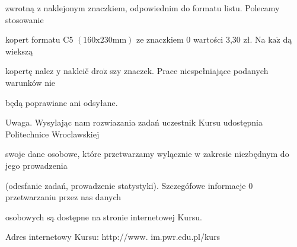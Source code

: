 \documentclass[a4paper,12pt]{article}
\begin{document}
zwrotną $\mathrm{z}$ naklejonym znaczkiem, odpowiednim do formatu listu. Polecamy stosowanie

kopert formatu C5 $(160\mathrm{x}230\mathrm{m}\mathrm{m})$ ze znaczkiem $0$ wartości 3,30 zł. Na $\mathrm{k}\mathrm{a}\dot{\mathrm{z}}$ dą wiekszą

kopertę nalez $\mathrm{y}$ nakleič $\mathrm{d}\mathrm{r}\mathrm{o}\dot{\mathrm{z}}$ szy znaczek. Prace niespełniające podanych warunków nie

będą poprawiane ani odsyłane.

Uwaga. Wysylając nam rozwiazania zadań uczestnik Kursu udostępnia Politechnice Wroclawskiej

swoje dane osobowe, które przetwarzamy wylącznie $\mathrm{w}$ zakresie niezbędnym do jego prowadzenia

(odesfanie zadań, prowadzenie statystyki). Szczegófowe informacje $0$ przetwarzaniu przez nas danych

osobowych są dostępne na stronie internetowej Kursu.

Adres internetowy Kursu: http://www. im.pwr.edu.pl/kurs
\end{document}

